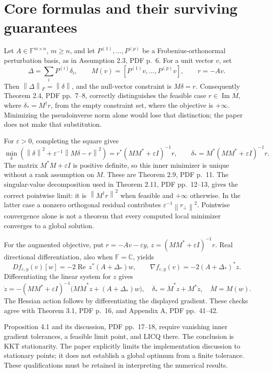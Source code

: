 \documentclass[10pt]{article}
\begin{document}
\section*{Core formulas and their surviving guarantees}
Let \(A\in\mathbb F^{m\times n}\), \(m\ge n\), and let \(P^{(1)},\ldots,P^{(p)}\) be a Frobenius-orthonormal perturbation basis, as in Assumption 2.3, PDF p. 6. For a unit vector \(v\), set \[\Delta=\sum_iP^{(i)}\delta_i,\qquad
 M(v)=[P^{(1)}v,\ldots,P^{(p)}v],\qquad r=-Av .\] Then \(\left\lVert\Delta\right\rVert_F=\left\lVert\delta\right\rVert\), and the null-vector constraint is \(M\delta=r\). Consequently Theorem 2.4, PDF pp. 7–8, correctly distinguishes the feasible case \(r\in\operatorname{Im}M\), where \(\delta_*=M^\dagger r\), from the empty constraint set, where the objective is \(+\infty\). Minimizing the pseudoinverse norm alone would lose that distinction; the paper does not make that substitution.\par
For \(\varepsilon>0\), completing the square gives \[\min_\delta\left(\left\lVert\delta\right\rVert^2+
             \varepsilon^{-1}\left\lVert M\delta-r\right\rVert^2\right)
 =r^*(MM^*+\varepsilon I)^{-1}r,\qquad
 \delta_*=M^*(MM^*+\varepsilon I)^{-1}r.\] The matrix \(M^*M+\varepsilon I\) is positive definite, so this inner minimizer is unique without a rank assumption on \(M\). These are Theorem 2.9, PDF p. 11. The singular-value decomposition used in Theorem 2.11, PDF pp. 12–13, gives the correct pointwise limit: it is \(\left\lVert M^\dagger r\right\rVert^2\) when feasible and \(+\infty\) otherwise. In the latter case a nonzero orthogonal residual contributes \(\varepsilon^{-1}\left\lVert r_\perp\right\rVert^2\). Pointwise convergence alone is not a theorem that every computed local minimizer converges to a global solution.\par
For the augmented objective, put \(r=-Av-\varepsilon y\), \(z=(MM^*+\varepsilon I)^{-1}r\). Real directional differentiation, also when \(\mathbb F=\mathbb C\), yields \[Df_{\varepsilon,y}(v)[w]
 =-2\operatorname{Re}\,z^*(A+\Delta_*)w,\qquad
 \nabla f_{\varepsilon,y}(v)=-2(A+\Delta_*)^*z.\] Differentiating the linear system for \(z\) gives \[\dot z=-(MM^*+\varepsilon I)^{-1}
           \bigl(M\dot M^*z+(A+\Delta_*)w\bigr),
 \quad
 \dot\delta_*=\dot M^*z+M^*\dot z,\quad \dot M=M(w).\] The Hessian action follows by differentiating the displayed gradient. These checks agree with Theorem 3.1, PDF p. 16, and Appendix A, PDF pp. 41–42.\par
Proposition 4.1 and its discussion, PDF pp. 17–18, require vanishing inner gradient tolerances, a feasible limit point, and LICQ there. The conclusion is KKT stationarity. The paper explicitly limits the implementation discussion to stationary points; it does not establish a global optimum from a finite tolerance. These qualifications must be retained in interpreting the numerical results.\par
\end{document}
